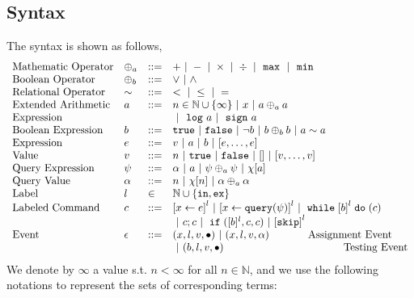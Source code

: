 %
%
\subsection{Syntax}
The syntax is shown as follows,
\[
\begin{array}{llll}
\mbox{Mathematic Operator} 
& \oplus_a & ::= & + ~|~ - ~|~ \times 
%
~|~ \div 
~|~ \emax 
~|~ \emin \\ 
\mbox{Boolean Operator} 
& \oplus_b & ::= & \lor ~|~ \land
\\
%
\mbox{Relational Operator} 
& \sim & ::= & < ~|~ \leq ~|~ =
\\ 
%
\mbox{Extended Arithmetic} 
& \aexpr & ::= & 
n \in \mathbb{N}\cup\{\infty\} ~|~ {x} ~|~ \aexpr \oplus_a \aexpr 
\\ 
\mbox{Expression}
& & &
~|~ \elog \aexpr ~|~ \esign \aexpr
\\
%
\mbox{Boolean Expression} & \bexpr & ::= & 
%
\etrue ~|~ \efalse ~|~ \neg \bexpr
 ~|~ \bexpr \oplus_b \bexpr
%
~|~ \aexpr \sim \aexpr 
\\
%
\mbox{Expression} & \expr & ::= & v ~|~ \aexpr ~|~ \bexpr 
~|~ [\expr, \dots, \expr]
\\ 
%
\mbox{Value} 
& v & ::= & { n ~|~ \etrue ~|~ \efalse ~|~ [] ~|~ [v, \dots, v]} 
\\
%
\mbox{Query Expression} 
& {\qexpr} & ::= 
& { \qval ~|~ \aexpr ~|~ \qexpr \oplus_a \qexpr ~|~ \chi[\aexpr]} 
\\
%
\mbox{Query Value} & \qval & ::= 
& {n ~|~ \chi[n] ~|~ \qval \oplus_a \qval}
\\
%
\mbox{Label} 
& l & \in & \mathbb{N} \cup \{\lin, \lex\} 
\\ 
%
\mbox{Labeled Command} 
& {c} & ::= & \clabel{\assign{x}{\expr}}^{l} ~|~ \clabel{\assign{x}{\query(\qexpr)}}^{l}
~|~ {\ewhile \clabel{\bexpr}^{l} \edo ({c}) }
\\
&&&
~|~ {c};{c} 
~|~ \eif(\clabel{\bexpr}{}^l , {c}, {c}) 
~|~ \clabel{\eskip}^l\\ 
\mbox{Event} 
& \event & ::= & 
 ({x}, l, v, \bullet) ~|~ ({x}, l, v, \qval) ~~~~~~~~~~~ \mbox{Assignment Event} \\
&&& ~|~(\bexpr, l, v, \bullet) ~~~~~~~~~~~~~~~~~~~~~~~~~~~~~~~~~~ \mbox{Testing Event}
\\
\end{array}
\]
We denote by $\infty$ a value s.t. $n < \infty $ for all $n \in \mathbb{N}$, and we use the following notations to represent the sets of corresponding terms:
